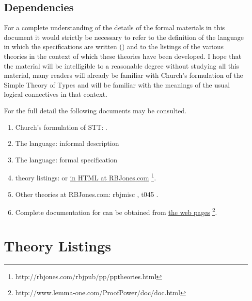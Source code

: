 \subsection{Dependencies}

For a complete understanding of the details of the formal materials in this document it would strictly be necessary to refer to the definition of the language in which the specifications are written (\ProductHOL) and to the listings of the various theories in the context of which these theories have been developed.
I hope that the material will be intelligible to a reasonable degree without studying all this material, many readers will already be familiar with Church's formulation of the Simple Theory of Types \cite{church40} and will be familiar with the meanings of the usual logical connectives in that context.

For the full detail the following documents may be consulted.

\begin{enumerate}
\item Church's formulation of STT: \cite{church40}.
\item The {\ProductHOL} language: informal description \cite{ds/fmu/ied/usr005}
\item The {\ProductHOL} language: formal specification \cite{ds/fmu/ied/spc001}
\item {\ProductHOL} theory listings: \cite{lemma1/hol/usr029} or \href{http://rbjones.com/rbjpub/pp/pptheories.html}{in HTML at RBJones.com}%
\footnote{http://rbjones.com/rbjpub/pp/pptheories.html}.
\item Other theories at RBJones.com: rbjmisc \cite{rbjt006}, t045 \cite{rbjt045}.
\item Complete documentation for {\Product} can be obtained from \href{http://www.lemma-one.com/ProofPower/doc/doc.html}{the {\Product} web pages}%
\footnote{http://www.lemma-one.com/ProofPower/doc/doc.html}.
\end{enumerate}

\section{Theory Listings}

